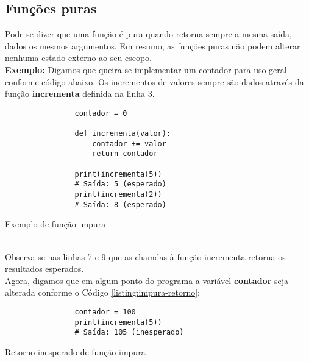 \documentclass[date,twocolumn,a4paper]{ppgem}
\begin{document}
    \subsection{Funções puras}
        Pode-se dizer que uma função é pura quando retorna sempre a mesma saída, dados os mesmos argumentos\cite{queiroz_func_prog}. Em resumo, as funções
        puras não podem alterar nenhuma estado externo ao seu escopo.\\
        \textbf{Exemplo:}
        Digamos que queira-se implementar um contador para uso geral conforme código abaixo. Os incrementos de valores sempre são dados através da função
        \textbf{incrementa} definida na linha 3.
        \begin{listing}[!ht]
            \begin{verbatim}
                contador = 0

                def incrementa(valor):
                    contador += valor
                    return contador

                print(incrementa(5))
                # Saída: 5 (esperado)
                print(incrementa(2))
                # Saída: 8 (esperado)
            \end{verbatim}
            \caption{Exemplo de função impura}
            \label{listing:impura}
        \end{listing}
        \\Observa-se nas linhas 7 e 9 que as chamdas à função incrementa retorna os resultados esperados.\\
        Agora, digamos que em algum ponto do programa a variável \textbf{contador} seja alterada conforme o
        Código \ref{listing:impura-retorno}:

        \begin{listing}[!ht]
            \begin{verbatim}
                contador = 100
                print(incrementa(5))
                # Saída: 105 (inesperado)
            \end{verbatim}
            \caption{Retorno inesperado de função impura}
            \label{listing:impura-retorno}
        \end{listing}
\end{document}

